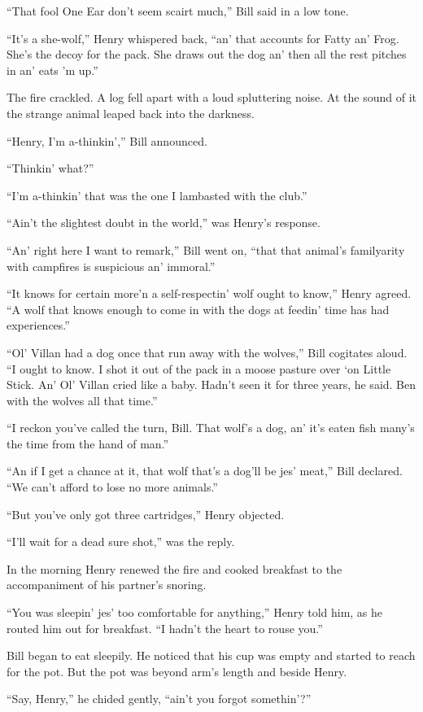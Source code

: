 \documentclass[10pt]{book}
\begin{document}
“That fool One Ear don’t seem scairt much,” Bill said in a low tone.

“It’s a she-wolf,” Henry whispered back, “an’ that accounts for Fatty
an’ Frog. She’s the decoy for the pack. She draws out the dog an’ then
all the rest pitches in an’ eats ’m up.”

The fire crackled. A log fell apart with a loud spluttering noise. At
the sound of it the strange animal leaped back into the darkness.

“Henry, I’m a-thinkin’,” Bill announced.

“Thinkin’ what?”

“I’m a-thinkin’ that was the one I lambasted with the club.”

“Ain’t the slightest doubt in the world,” was Henry’s response.

“An’ right here I want to remark,” Bill went on, “that that animal’s
familyarity with campfires is suspicious an’ immoral.”

“It knows for certain more’n a self-respectin’ wolf ought to know,”
Henry agreed. “A wolf that knows enough to come in with the dogs at
feedin’ time has had experiences.”

“Ol’ Villan had a dog once that run away with the wolves,” Bill
cogitates aloud. “I ought to know. I shot it out of the pack in a moose
pasture over ‘on Little Stick. An’ Ol’ Villan cried like a baby. Hadn’t
seen it for three years, he said. Ben with the wolves all that time.”

“I reckon you’ve called the turn, Bill. That wolf’s a dog, an’ it’s
eaten fish many’s the time from the hand of man.”

“An if I get a chance at it, that wolf that’s a dog’ll be jes’ meat,”
Bill declared. “We can’t afford to lose no more animals.”

“But you’ve only got three cartridges,” Henry objected.

“I’ll wait for a dead sure shot,” was the reply.

In the morning Henry renewed the fire and cooked breakfast to the
accompaniment of his partner’s snoring.

“You was sleepin’ jes’ too comfortable for anything,” Henry told him,
as he routed him out for breakfast. “I hadn’t the heart to rouse you.”

Bill began to eat sleepily. He noticed that his cup was empty and
started to reach for the pot. But the pot was beyond arm’s length and
beside Henry.

“Say, Henry,” he chided gently, “ain’t you forgot somethin’?”
\end{document}

